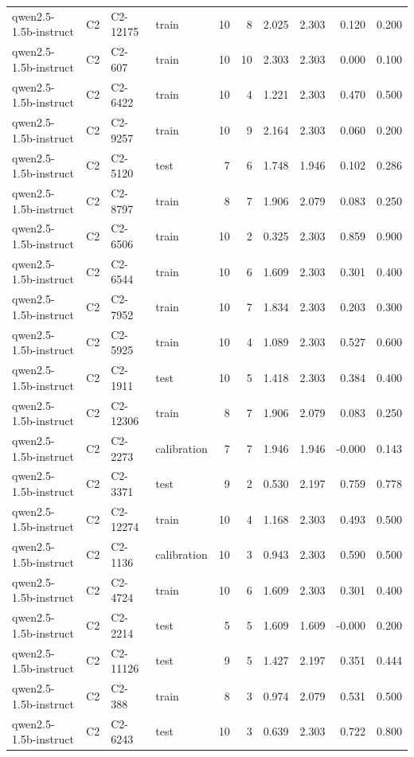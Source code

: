 \begin{table}
\begin{tabular}{llllrrrrrr}
qwen2.5-1.5b-instruct & C2 & C2-12175 & train & 10 & 8 & 2.025 & 2.303 & 0.120 & 0.200 \\
qwen2.5-1.5b-instruct & C2 & C2-607 & train & 10 & 10 & 2.303 & 2.303 & 0.000 & 0.100 \\
qwen2.5-1.5b-instruct & C2 & C2-6422 & train & 10 & 4 & 1.221 & 2.303 & 0.470 & 0.500 \\
qwen2.5-1.5b-instruct & C2 & C2-9257 & train & 10 & 9 & 2.164 & 2.303 & 0.060 & 0.200 \\
qwen2.5-1.5b-instruct & C2 & C2-5120 & test & 7 & 6 & 1.748 & 1.946 & 0.102 & 0.286 \\
qwen2.5-1.5b-instruct & C2 & C2-8797 & train & 8 & 7 & 1.906 & 2.079 & 0.083 & 0.250 \\
qwen2.5-1.5b-instruct & C2 & C2-6506 & train & 10 & 2 & 0.325 & 2.303 & 0.859 & 0.900 \\
qwen2.5-1.5b-instruct & C2 & C2-6544 & train & 10 & 6 & 1.609 & 2.303 & 0.301 & 0.400 \\
qwen2.5-1.5b-instruct & C2 & C2-7952 & train & 10 & 7 & 1.834 & 2.303 & 0.203 & 0.300 \\
qwen2.5-1.5b-instruct & C2 & C2-5925 & train & 10 & 4 & 1.089 & 2.303 & 0.527 & 0.600 \\
qwen2.5-1.5b-instruct & C2 & C2-1911 & test & 10 & 5 & 1.418 & 2.303 & 0.384 & 0.400 \\
qwen2.5-1.5b-instruct & C2 & C2-12306 & train & 8 & 7 & 1.906 & 2.079 & 0.083 & 0.250 \\
qwen2.5-1.5b-instruct & C2 & C2-2273 & calibration & 7 & 7 & 1.946 & 1.946 & -0.000 & 0.143 \\
qwen2.5-1.5b-instruct & C2 & C2-3371 & test & 9 & 2 & 0.530 & 2.197 & 0.759 & 0.778 \\
qwen2.5-1.5b-instruct & C2 & C2-12274 & train & 10 & 4 & 1.168 & 2.303 & 0.493 & 0.500 \\
qwen2.5-1.5b-instruct & C2 & C2-1136 & calibration & 10 & 3 & 0.943 & 2.303 & 0.590 & 0.500 \\
qwen2.5-1.5b-instruct & C2 & C2-4724 & train & 10 & 6 & 1.609 & 2.303 & 0.301 & 0.400 \\
qwen2.5-1.5b-instruct & C2 & C2-2214 & test & 5 & 5 & 1.609 & 1.609 & -0.000 & 0.200 \\
qwen2.5-1.5b-instruct & C2 & C2-11126 & test & 9 & 5 & 1.427 & 2.197 & 0.351 & 0.444 \\
qwen2.5-1.5b-instruct & C2 & C2-388 & train & 8 & 3 & 0.974 & 2.079 & 0.531 & 0.500 \\
qwen2.5-1.5b-instruct & C2 & C2-6243 & test & 10 & 3 & 0.639 & 2.303 & 0.722 & 0.800 \\

\end{tabular}
\end{table}
